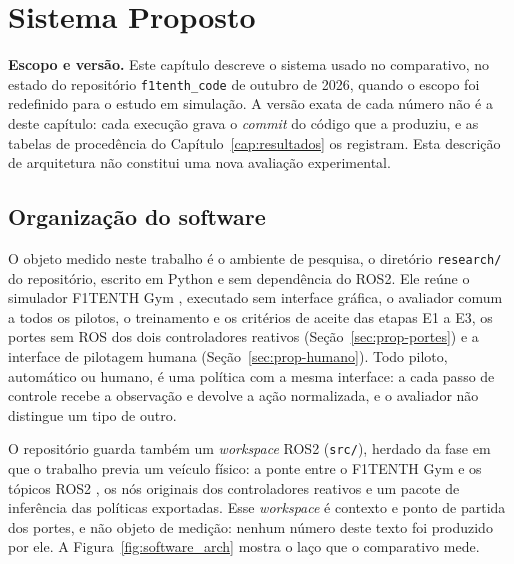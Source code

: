 \chapter{Sistema Proposto}\label{cap:proposta}

\noindent\textbf{Escopo e versão.} Este capítulo descreve o sistema usado no
comparativo, no estado do repositório \texttt{f1tenth\_code} de outubro de 2026,
quando o escopo foi redefinido para o estudo em simulação. A versão exata de cada
número não é a deste capítulo: cada execução grava o \textit{commit} do código que
a produziu, e as tabelas de procedência do Capítulo~\ref{cap:resultados} os
registram. Esta descrição de arquitetura não constitui uma nova avaliação
experimental.

\section{Organização do software}

O objeto medido neste trabalho é o ambiente de pesquisa, o diretório
\texttt{research/} do repositório, escrito em Python e sem dependência do ROS2.
Ele reúne o simulador F1TENTH Gym \cite{OKelly2020F1TENTH}, executado sem
interface gráfica, o avaliador comum a todos os pilotos, o treinamento e os
critérios de aceite das etapas E1 a E3, os portes sem ROS dos dois controladores
reativos (Seção~\ref{sec:prop-portes}) e a interface de pilotagem humana
(Seção~\ref{sec:prop-humano}). Todo piloto, automático ou humano, é uma política
com a mesma interface: a cada passo de controle recebe a observação e devolve a
ação normalizada, e o avaliador não distingue um tipo de outro.

O repositório guarda também um \textit{workspace} ROS2 (\texttt{src/}), herdado da
fase em que o trabalho previa um veículo físico: a ponte entre o F1TENTH Gym e os
tópicos ROS2 \cite{f1tenthgymros, f1tenthgymufabc}, os nós originais dos
controladores reativos e um pacote de inferência das políticas exportadas. Esse
\textit{workspace} é contexto e ponto de partida dos portes, e não objeto de
medição: nenhum número deste texto foi produzido por ele. A
Figura~\ref{fig:software_arch} mostra o laço que o comparativo mede.

